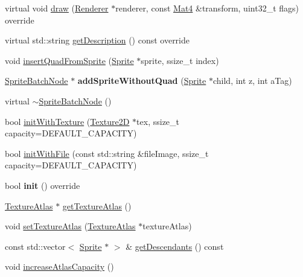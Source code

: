 \begin{DoxyCompactItemize}
\item 
virtual void \hyperlink{classSpriteBatchNode_afa716d3c463c59a6748d68f24045ba9f}{draw} (\hyperlink{classRenderer}{Renderer} $\ast$renderer, const \hyperlink{classMat4}{Mat4} \&transform, uint32\+\_\+t flags) override
\item 
virtual std\+::string \hyperlink{classSpriteBatchNode_abaf755bc79646464f59b68b5a4fdc68c}{get\+Description} () const override
\item 
void \hyperlink{classSpriteBatchNode_ae3aa8d2d53d2e6ba43a03770e8a88a41}{insert\+Quad\+From\+Sprite} (\hyperlink{classSprite}{Sprite} $\ast$sprite, ssize\+\_\+t index)
\item 
\mbox{\label{classSpriteBatchNode_ac2dd3c8c6a1e38f1c31f2f575287edb4}} 
\hyperlink{classSpriteBatchNode}{Sprite\+Batch\+Node} $\ast$ {\bfseries add\+Sprite\+Without\+Quad} (\hyperlink{classSprite}{Sprite} $\ast$child, int z, int a\+Tag)
\item 
virtual \hyperlink{classSpriteBatchNode_a41036ad846110453c8936fdebbdf2833}{$\sim$\+Sprite\+Batch\+Node} ()
\item 
bool \hyperlink{classSpriteBatchNode_aeec99ca2f5e03b80fb8d1f81bbc5034a}{init\+With\+Texture} (\hyperlink{classTexture2D}{Texture2D} $\ast$tex, ssize\+\_\+t capacity=D\+E\+F\+A\+U\+L\+T\+\_\+\+C\+A\+P\+A\+C\+I\+TY)
\item 
bool \hyperlink{classSpriteBatchNode_af6150c9adf70652842ca6e7b01c8cc08}{init\+With\+File} (const std\+::string \&file\+Image, ssize\+\_\+t capacity=D\+E\+F\+A\+U\+L\+T\+\_\+\+C\+A\+P\+A\+C\+I\+TY)
\item 
\mbox{\label{classSpriteBatchNode_a6016e84d966db338de57b2bbe00567ca}} 
bool {\bfseries init} () override
\item 
\hyperlink{classTextureAtlas}{Texture\+Atlas} $\ast$ \hyperlink{classSpriteBatchNode_ad6a2949d1af5b70038158ae0a6c84fff}{get\+Texture\+Atlas} ()
\item 
void \hyperlink{classSpriteBatchNode_a53497de819859ff84079d77e11cbd512}{set\+Texture\+Atlas} (\hyperlink{classTextureAtlas}{Texture\+Atlas} $\ast$texture\+Atlas)
\item 
const std\+::vector$<$ \hyperlink{classSprite}{Sprite} $\ast$ $>$ \& \hyperlink{classSpriteBatchNode_adcf146809bbf5d09e2228cf1cff65e06}{get\+Descendants} () const
\item 
void \hyperlink{classSpriteBatchNode_ad76d544ea06e10d6413ab978c868bc70}{increase\+Atlas\+Capacity} ()

\end{DoxyCompactItemize}
